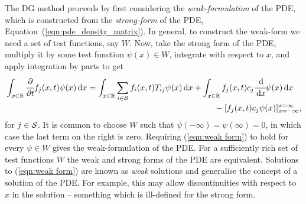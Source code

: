 The DG method proceeds by first considering the \textit{weak-formulation} of the PDE, which is constructed from the \textit{strong-form} of the PDE, Equation~(\ref{eqn:pde_density_matrix}). In general, to construct the weak-form we need a set of test functions, say \(W\). Now, take the strong form of the PDE, multiply it by some test function \(\psi(x)\in W\), integrate with respect to \(x\), and apply integration by parts to get 
\begin{align}
\begin{multlined}[t]
	\int_{x\in\mathbb R}\cfrac{\partial}{\partial t} f_j(x,t)\psi(x)\wrt x = \int_{x\in\mathbb R} \sum_{i\in\calS}f_i(x,t)T_{ij}\psi(x)\wrt x 
	+  \int_{x\in\mathbb R} f_j(x,t)c_j\cfrac{\wrt}{\wrt x}\psi(x)\wrt x \\{}- [ f_j(x,t)c_j\psi(x)]_{x=-\infty}^{x=\infty}, \end{multlined}\label{eqn:weak form}
\end{align}
for \(j\in\mathcal{S}\). It is common to choose \(W\) such that \(\psi(-\infty)=\psi(\infty)=0\), in which case the last term on the right is zero. Requiring (\ref{eqn:weak form}) to hold for every \(\psi\in W\) gives the weak-formulation of the PDE. For a sufficiently rich set of test functions \(W\) the weak and strong forms of the PDE are equivalent. Solutions to (\ref{eqn:weak form}) are known as \textit{weak} solutions and generalise the concept of a solution of the PDE. For example, this may allow discontinuities with respect to \(x\) in the solution -- something which is ill-defined for the strong form.

